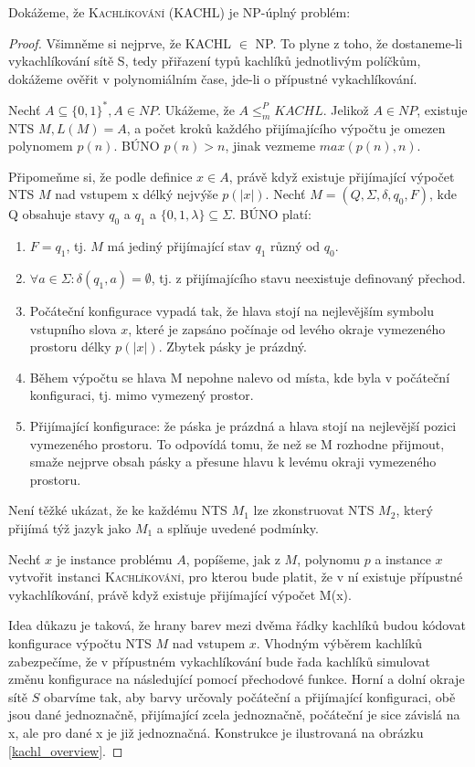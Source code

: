 \documentclass[11pt]{report} %
\begin{document}
Dokážeme, že \textsc{Kachlíkování (KACHL)} je NP-úplný problém:
\begin{proof}
Všimněme si nejprve, že KACHL $\in$ NP. To plyne z toho, že dostaneme-li vykachlíkování sítě S, tedy přiřazení typů kachlíků jednotlivým políčkům, dokážeme ověřit v polynomiálním čase, jde-li o přípustné vykachlíkování. 
 
Nechť $A \subseteq \{0,1\}^*, A \in NP $. Ukážeme, že $A \leq_m^P KACHL$. Jelikož $A \in NP$, existuje NTS $M, L(M) = A$, a počet kroků každého přijímajícího výpočtu je omezen polynomem $p(n)$. BÚNO $p(n) > n$, jinak vezmeme $max(p(n), n)$.

Připomeňme si, že podle definice $x \in A$, právě když existuje přijímající výpočet NTS $M$ nad vstupem x délký nejvýše $p(|x|)$. Nechť $M = (Q, \Sigma, \delta, q_0, F)$, kde Q obsahuje stavy $q_0$ a $q_1$ a $\{0, 1, \lambda\} \subseteq \Sigma$. BÚNO platí:
\begin{enumerate}
	\leftskip 20pt
	\setlength{\itemsep}{0pt}
	\item  $F = {q_1}$, tj. $M$ má jediný přijímající stav $q_1$ různý od $q_0$.
	\item $\forall a \in \Sigma : \delta(q_1, a) = \emptyset$, tj. z přijímajícího stavu neexistuje definovaný přechod.
	\item Počáteční konfigurace vypadá tak, že hlava stojí na nejlevějším symbolu vstupního slova $x$, které je zapsáno počínaje od levého okraje vymezeného prostoru délky $p(|x|)$. Zbytek pásky je prázdný.
	\item Během výpočtu se hlava M nepohne nalevo od místa, kde byla v počáteční konfiguraci, tj. mimo vymezený prostor.
	\item Přijímající konfigurace: že páska je prázdná a hlava stojí na nejlevější pozici vymezeného prostoru. To odpovídá tomu, že než se M rozhodne přijmout, smaže nejprve obsah pásky a přesune hlavu k levému okraji vymezeného prostoru.
\end{enumerate}
Není těžké ukázat, že ke každému NTS $M_1$ lze zkonstruovat NTS $M_2$, který přijímá týž jazyk jako $M_1$ a splňuje uvedené podmínky.

Nechť $x$ je instance problému $A$, popíšeme, jak z $M$, polynomu $p$ a instance $x$ vytvořit instanci \textsc{Kachlíkování}, pro kterou bude platit, že v ní existuje přípustné vykachlíkování, právě když existuje přijímající výpočet M(x).

Idea důkazu je taková, že hrany barev mezi dvěma řádky kachlíků budou kódovat konfigurace výpočtu NTS $M$ nad vstupem $x$. Vhodným výběrem kachlíků zabezpečíme, že v přípustném vykachlíkování bude řada kachlíků simulovat změnu konfigurace na následující pomocí přechodové funkce. Horní a dolní okraje sítě $S$ obarvíme tak, aby barvy určovaly počáteční a
přijímající konfiguraci, obě jsou dané jednoznačně, přijímající zcela jednoznačně, počáteční je sice závislá na x, ale pro dané x je již jednoznačná. Konstrukce je ilustrovaná na obrázku \ref{kachl_overview}.


\end{proof}
\end{document}

